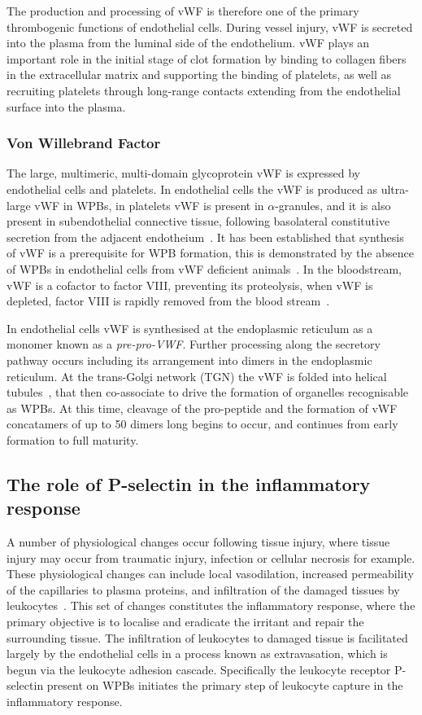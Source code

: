 The production and processing of vWF is therefore one of the primary thrombogenic functions of endothelial cells. During vessel injury, vWF is secreted into the plasma from the luminal side of the endothelium. vWF plays an important role in the initial stage of clot formation by binding to collagen fibers in the extracellular matrix and supporting the binding of platelets, as well as recruiting platelets through long-range contacts extending from the endothelial surface into the plasma.

\subsubsection{Von Willebrand Factor}
The large, multimeric, multi-domain glycoprotein vWF is expressed by endothelial cells and platelets. In endothelial cells the vWF is produced as ultra-large vWF in WPBs, in platelets vWF is present in $\alpha$-granules, and it is also present in  subendothelial connective tissue, following basolateral constitutive secretion from the adjacent endotheium~\cite{Sadler1998}. It has been established that synthesis of vWF is a prerequisite for WPB formation, this is demonstrated by the absence of WPBs in endothelial cells from vWF deficient animals~\cite{Serpe2008}. In the bloodstream, vWF is a cofactor to factor VIII, preventing its proteolysis, when vWF is depleted, factor VIII is rapidly removed from the blood stream~\cite{Sadler1998}.

In endothelial cells vWF is synthesised at the endoplasmic reticulum as a monomer known as a \emph{pre-pro-VWF}. Further processing along the secretory pathway occurs including its arrangement into dimers in the endoplasmic reticulum. At the trans-Golgi network (TGN) the vWF is folded into helical tubules~\cite{Ewenstein1987}, that then co-associate to drive the formation of organelles recognisable as WPBs. At this time, cleavage of the pro-peptide and the formation of vWF concatamers of up to 50 dimers long begins to occur, and continues from early formation to full maturity.

\subsection{The role of P-selectin in the inflammatory response}
\label{introduction:endothelial_cellular_biology:p-selectin_inflammatory_cascade}
A number of physiological changes occur following tissue injury, where tissue injury may occur from traumatic injury, infection or cellular necrosis for example. These physiological changes can include local vasodilation, increased permeability of the capillaries to plasma proteins, and infiltration of the damaged tissues by leukocytes~\cite{Hall2011}. This set of changes constitutes the inflammatory response, where the primary objective is to localise and eradicate the irritant and repair the surrounding tissue. The infiltration of leukocytes to damaged tissue is facilitated largely by the endothelial cells in a process known as extravasation, which is begun via the leukocyte adhesion cascade. Specifically the leukocyte receptor P-selectin present on WPBs initiates the primary step of leukocyte capture in the inflammatory response.

